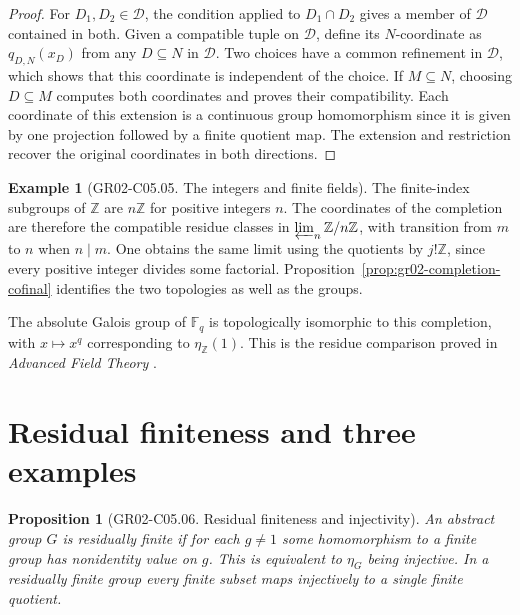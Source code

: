 \documentclass[11pt,oneside,openany]{book}
\newtheorem{proposition}[theorem]{Proposition}
\theoremstyle{definition}
\newtheorem{example}[theorem]{Example}
\theoremstyle{remark}
\begin{document}
\begin{proof}
For \(D_1,D_2\in\mathcal D\), the condition applied to
\(D_1\cap D_2\) gives a member of \(\mathcal D\) contained in both.
Given a compatible tuple on \(\mathcal D\), define its \(N\)-coordinate
as \(q_{D,N}(x_D)\) from any \(D\subseteq N\) in \(\mathcal D\).
Two choices have a common refinement in \(\mathcal D\), which
shows that this coordinate is independent of the choice.
If \(M\subseteq N\), choosing \(D\subseteq M\) computes both
coordinates and proves their compatibility. Each coordinate of
this extension is a continuous group homomorphism since it is
given by one projection followed by a finite quotient map.
The extension and restriction recover the original coordinates
in both directions.
\end{proof}

\begin{example}[GR02-C05.05. The integers and finite fields]
\label{ex:gr02-completion-integers}
The finite-index subgroups of \(\mathbb Z\) are \(n\mathbb Z\) for
positive integers \(n\). The coordinates of the completion are
therefore the compatible residue classes in
\(\varprojlim_n\mathbb Z/n\mathbb Z\), with transition from \(m\)
to \(n\) when \(n\mid m\). One obtains the same limit using
the quotients by \(j!\mathbb Z\), since every positive integer
divides some factorial. Proposition~\ref{prop:gr02-completion-cofinal}
identifies the two topologies as well as the groups.

The absolute Galois group of \(\mathbb F_q\) is topologically
isomorphic to this completion, with \(x\mapsto x^q\) corresponding
to \(\eta_{\mathbb Z}(1)\). This is the residue comparison proved
in \emph{Advanced Field Theory} \cite[Result E06]{field}.
\end{example}

\section{Residual finiteness and three examples}

\begin{proposition}[GR02-C05.06. Residual finiteness and injectivity]
\label{prop:gr02-residual-finiteness}
An abstract group \(G\) is \emph{residually finite} if for each
\(g\ne 1\) some homomorphism to a finite group has nonidentity
value on \(g\). This is equivalent to \(\eta_G\) being injective.
In a residually finite group every finite subset maps injectively
to a single finite quotient.
\end{proposition}
\end{document}
